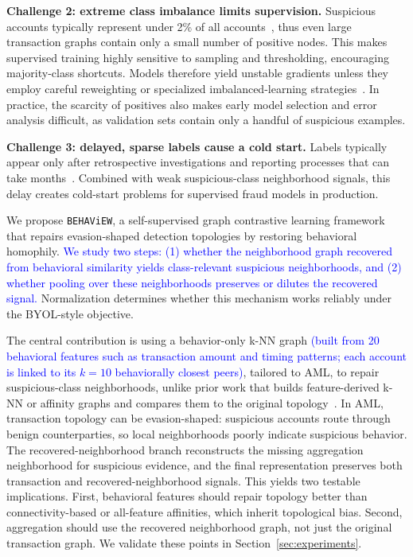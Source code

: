 \documentclass[sigconf,natbib=true,anonymous=true]{acmart}
\theoremstyle{definition}
\newcommand{\method}{\texttt{BEHAViEW}\xspace}
\newcommand{\BLUE}[1]{\textcolor{blue}{#1}}
\begin{document}
\textbf{Challenge 2: extreme class imbalance limits supervision.} Suspicious accounts typically represent under 2\% of all accounts~\cite{hilal2022financial}, thus even large transaction graphs contain only a small number of positive nodes. This makes supervised training highly sensitive to sampling and thresholding, encouraging majority-class shortcuts. Models therefore yield unstable gradients unless they employ careful reweighting or specialized imbalanced-learning strategies~\cite{he2009imbalanced,chawla2002smote,dou2020enhancing,liu2021pick}. In practice, the scarcity of positives also makes early model selection and error analysis difficult, as validation sets contain only a handful of suspicious examples.

\textbf{Challenge 3: delayed, sparse labels cause a cold start.} Labels typically appear only after retrospective investigations and reporting processes that can take months~\cite{fatf2013guidance,kofia2024aml}. Combined with weak suspicious-class neighborhood signals, this delay creates cold-start problems for supervised fraud models in production.

We propose \method, a self-supervised graph contrastive learning framework that repairs evasion-shaped detection topologies by restoring behavioral homophily.
\BLUE{We study two steps: (1) whether the neighborhood graph recovered from behavioral similarity yields class-relevant suspicious neighborhoods, and (2) whether pooling over these neighborhoods preserves or dilutes the recovered signal.}
Normalization determines whether this mechanism works reliably under the BYOL-style objective.

The central contribution is using a behavior-only k-NN graph\BLUE{ (built from 20 behavioral features such as transaction amount and timing patterns; each account is linked to its $k{=}10$ behaviorally closest peers)}, tailored to AML, to repair suspicious-class neighborhoods, unlike prior work that builds feature-derived k-NN or affinity graphs and compares them to the original topology~\cite{shang2023mlgcl,fan2021featuretopology,chen2023asp,lu2024graph}. In AML, transaction topology can be evasion-shaped: suspicious accounts route through benign counterparties, so local neighborhoods poorly indicate suspicious behavior. The recovered-neighborhood branch reconstructs the missing aggregation neighborhood for suspicious evidence, and the final representation preserves both transaction and recovered-neighborhood signals. This yields two testable implications. First, behavioral features should repair topology better than connectivity-based or all-feature affinities, which inherit topological bias. Second, aggregation should use the recovered neighborhood graph, not just the original transaction graph. We validate these points in Section~\ref{sec:experiments}.
\end{document}
